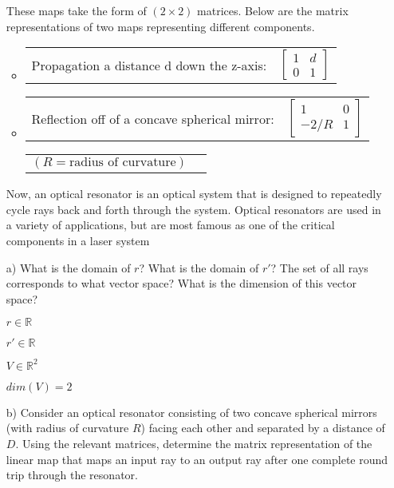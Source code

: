 \documentclass[fleqn]{article}
\begin{document}
\begin{enumerate}[nolistsep]
			These maps take the form of $(2 \times 2)$ matrices. Below are the matrix representations of two maps representing different components.
			
			\begingroup
			\renewcommand*{\arraystretch}{0.6}
			\begin{itemize}
				\item
					\begin{tabularx}{0.85\textwidth}{>{\hsize=0.75\hsize}X >{\hsize=0.25\hsize}X}
						Propagation a distance d down the z-axis: & $\begin{bmatrix}
							1 & d\\
							0 & 1
							\end{bmatrix}$
					\end{tabularx}
					
				\item
					\begin{tabularx}{0.85\textwidth}{>{\hsize=0.75\hsize}X  >{\hsize=0.25\hsize}X}
						Reflection off of a concave spherical mirror: & $\begin{bmatrix}
							 1   & 0\\
							-2/R & 1
							\end{bmatrix}$
					\end{tabularx}
					
					\begin{tabularx}{0.85\textwidth}{>{\hsize=0.75\hsize}X  >{\hsize=0.25\hsize}X}
						$(R = \text{radius of curvature})$ &\\						
					\end{tabularx}
			\end{itemize}
			\endgroup
				
			Now, an optical resonator is an optical system that is designed to repeatedly cycle rays back and forth through the system. Optical resonators are used in a variety of applications, but are most famous as one of the critical components in a laser system
			
			\item[a)] What is the domain of $r$? What is the domain of $r'$? The set of all rays corresponds to what vector space? What is the dimension of this vector space?
			
			$r \in \mathbb{R}$
			
			$r' \in \mathbb{R}$
			
			$V \in \mathbb{R}^2$
			
			$dim(V) = 2$
			
			\item[b)] Consider an optical resonator consisting of two concave spherical mirrors (with radius of curvature $R$) facing each other and separated by a distance of $D$. Using the relevant matrices, determine the matrix representation of the linear map that maps an input ray to an output ray after one complete round trip through the resonator.
			

\end{enumerate}
\end{document}
